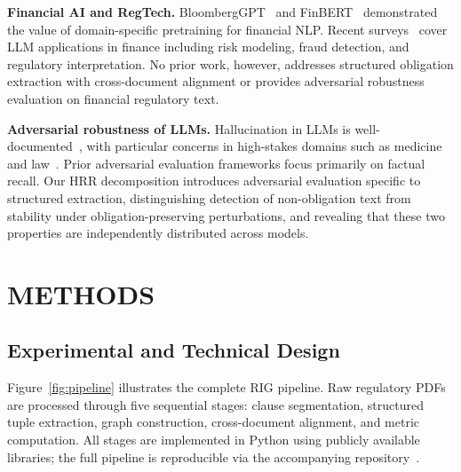 \documentclass{article}
\begin{document}
\textbf{Financial AI and RegTech.}
BloombergGPT~\cite{bloomberggpt2023} and FinBERT~\cite{finbert2020}
demonstrated the value of domain-specific pretraining for financial NLP.
Recent surveys~\cite{lisurvey2024} cover LLM applications in finance
including risk modeling, fraud detection, and regulatory interpretation.
No prior work, however, addresses structured obligation extraction with
cross-document alignment or provides adversarial robustness evaluation
on financial regulatory text.

\textbf{Adversarial robustness of LLMs.}
Hallucination in LLMs is well-documented~\cite{maynez2020}, with
particular concerns in high-stakes domains such as
medicine~\cite{singhal2023} and law~\cite{dahl2024}.
Prior adversarial evaluation frameworks focus primarily on factual recall.
Our HRR decomposition introduces adversarial evaluation specific to
structured extraction, distinguishing detection of non-obligation text
from stability under obligation-preserving perturbations, and revealing
that these two properties are independently distributed across models.

\section{METHODS}

\subsection{Experimental and Technical Design}

Figure~\ref{fig:pipeline} illustrates the complete RIG pipeline.
Raw regulatory PDFs are processed through five sequential stages:
clause segmentation, structured tuple extraction, graph construction,
cross-document alignment, and metric computation.
All stages are implemented in Python using publicly available libraries;
the full pipeline is reproducible via the accompanying
repository~\cite{rigcode2025}.
\end{document}
